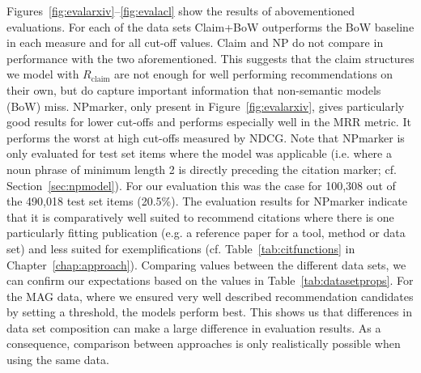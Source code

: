 Figures~\ref{fig:evalarxiv}--\ref{fig:evalacl} show the results of abovementioned evaluations. For each of the data sets Claim+BoW outperforms the BoW baseline in each measure and for all cut-off values. Claim and NP do not compare in performance with the two aforementioned. This suggests that the claim structures we model with $R_{\text{claim}}$ are not enough for well performing recommendations on their own, but do capture important information that non-semantic models (BoW) miss. NPmarker, only present in Figure~\ref{fig:evalarxiv}, gives particularly good results for lower cut-offs and performs especially well in the MRR metric. It performs the worst at high cut-offs measured by NDCG. Note that NPmarker is only evaluated for test set items where the model was applicable (i.e. where a noun phrase of minimum length 2 is directly preceding the citation marker; cf. Section~\ref{sec:npmodel}). For our evaluation this was the case for 100,308 out of the 490,018 test set items (20.5\%). The evaluation results for NPmarker indicate that it is comparatively well suited to recommend citations where there is one particularly fitting publication (e.g. a reference paper for a tool, method or data set) and less suited for exemplifications (cf. Table~\ref{tab:citfunctions} in Chapter~\ref{chap:approach}). Comparing values between the different data sets, we can confirm our expectations based on the values in Table~\ref{tab:datasetprops}. For the MAG data, where we ensured very well described recommendation candidates by setting a threshold, the models perform best.
This shows us that differences in data set composition can make a large difference in evaluation results. As a consequence, comparison between approaches is only realistically possible when using the same data.



